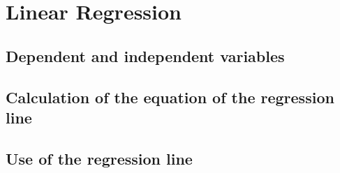 \chapter{Linear Regression}

\section{Dependent and independent variables}
\section{Calculation of the equation of the regression line}
\section{Use of the regression line}